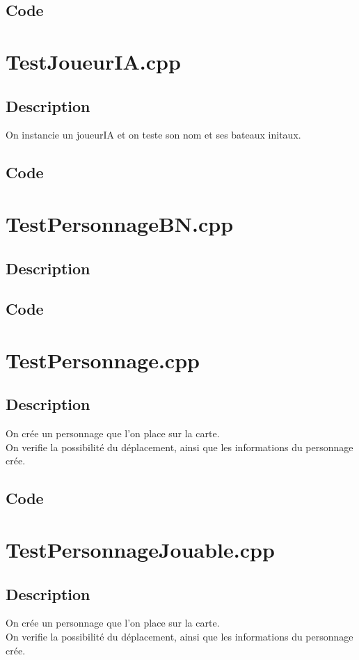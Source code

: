         \subsection{Code}
    \section{TestJoueurIA.cpp}
        \subsection{Description}
        On instancie un joueurIA et on teste son nom et ses bateaux initaux.
        \subsection{Code}
    \section{TestPersonnageBN.cpp}
        \subsection{Description}
        \subsection{Code}
    \section{TestPersonnage.cpp}
        \subsection{Description}
            On crée un personnage que l'on place sur la carte.\\
            On verifie la possibilité du déplacement, ainsi que les informations du personnage crée.
        \subsection{Code}
    \section{TestPersonnageJouable.cpp}
        \subsection{Description}
            On crée un personnage que l'on place sur la carte.\\
            On verifie la possibilité du déplacement, ainsi que les informations du personnage crée.
